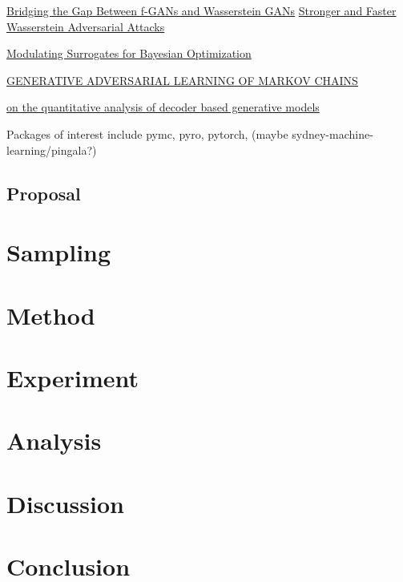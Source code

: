 \documentclass[honours,12pt]{unswthesis}
\numberwithin{equation}{section}
\begin{document}
\href{https://icml.cc/virtual/2020/poster/6640}{Bridging the Gap Between f-GANs and Wasserstein GANs}
\href{https://icml.cc/virtual/2020/poster/5871}{Stronger and Faster Wasserstein Adversarial Attacks}

\href{https://icml.cc/virtual/2020/poster/6028}{Modulating Surrogates for Bayesian Optimization}

\href{https://github.com/ermongroup/markov-chain-gan}{GENERATIVE ADVERSARIAL LEARNING
OF MARKOV CHAINS
}

\href{google search}{ on the quantitative analysis of decoder based generative models}

\noindent Packages of interest include pymc, pyro, pytorch, (maybe  sydney-machine-learning/pingala?)

\section{Proposal}



\chapter{Sampling}\label{samp}






\chapter{Method}\label{meth}




\chapter{Experiment}\label{expe}


\chapter{Analysis}\label{anal}


\chapter{Discussion}\label{disc}

\chapter{Conclusion}\label{conc}




\clearpage


\end{document}
